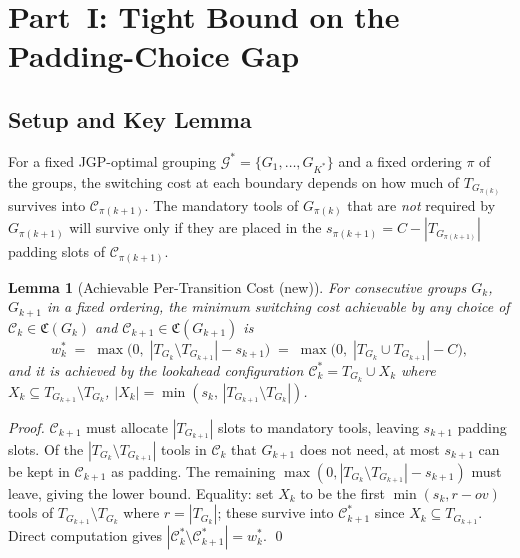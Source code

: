 \documentclass[11pt,a4paper]{article}
\theoremstyle{plain}
\newtheorem{lemma}[theorem]{Lemma}
\theoremstyle{definition}
\newcommand{\Cconf}{\mathfrak{C}}
\newcommand{\calG}{\mathcal{G}}
\newcommand{\Kstar}{K^{*}}
\begin{document}
\section{Part~I: Tight Bound on the Padding-Choice Gap}
\label{sec:partI}

\subsection{Setup and Key Lemma}

For a fixed JGP-optimal grouping $\calG^*=\{G_1,\ldots,G_{\Kstar}\}$ and a fixed
ordering $\pi$ of the groups, the switching cost at each boundary depends on how
much of $T_{G_{\pi(k)}}$ survives into $\mathcal{C}_{\pi(k+1)}$.
The mandatory tools of $G_{\pi(k)}$ that are \emph{not} required by $G_{\pi(k+1)}$
will survive only if they are placed in the $s_{\pi(k+1)}=C-|T_{G_{\pi(k+1)}}|$
padding slots of $\mathcal{C}_{\pi(k+1)}$.

\begin{thmbox}
\begin{lemma}[Achievable Per-Transition Cost {\normalfont (new)}]
\label{lem:transition}
For consecutive groups $G_k$, $G_{k+1}$ in a fixed ordering, the minimum switching
cost achievable by any choice of $\mathcal{C}_k\in\Cconf(G_k)$ and
$\mathcal{C}_{k+1}\in\Cconf(G_{k+1})$ is
\[
  w^*_k
  \;=\;
  \max\!\bigl(0,\;|T_{G_k}\setminus T_{G_{k+1}}|-s_{k+1}\bigr)
  \;=\;
  \max\!\bigl(0,\;|T_{G_k}\cup T_{G_{k+1}}|-C\bigr),
\]
and it is achieved by the \emph{lookahead} configuration
$\mathcal{C}_k^*=T_{G_k}\cup X_k$ where $X_k\subseteq T_{G_{k+1}}\setminus T_{G_k}$,
$|X_k|=\min(s_k,\,|T_{G_{k+1}}\setminus T_{G_k}|)$.
\end{lemma}
\end{thmbox}

\begin{proofbox}
\begin{proof}
$\mathcal{C}_{k+1}$ must allocate $|T_{G_{k+1}}|$ slots to mandatory tools,
leaving $s_{k+1}$ padding slots.
Of the $|T_{G_k}\setminus T_{G_{k+1}}|$ tools in $\mathcal{C}_k$ that $G_{k+1}$
does not need, at most $s_{k+1}$ can be kept in $\mathcal{C}_{k+1}$ as padding.
The remaining $\max(0,|T_{G_k}\setminus T_{G_{k+1}}|-s_{k+1})$ must leave,
giving the lower bound. Equality: set $X_k$ to be the first $\min(s_k,r-ov)$ tools
of $T_{G_{k+1}}\setminus T_{G_k}$ where $r=|T_{G_k}|$; these survive into
$\mathcal{C}_{k+1}^*$ since $X_k\subseteq T_{G_{k+1}}$.
Direct computation gives $|\mathcal{C}_k^*\setminus\mathcal{C}_{k+1}^*|=w^*_k$. \qed
\end{proof}
\end{proofbox}
\end{document}
